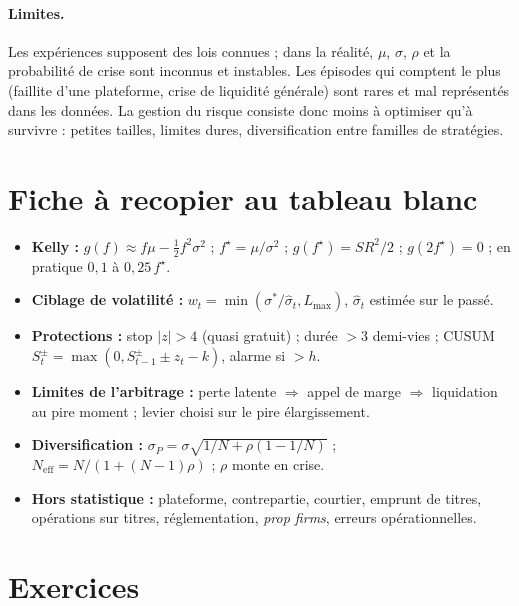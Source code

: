 \paragraph{Limites.} Les expériences supposent des lois connues ; dans la réalité, $\mu$, $\sigma$, $\rho$ et la probabilité de crise sont inconnus et instables. Les épisodes qui comptent le plus (faillite d'une plateforme, crise de liquidité générale) sont rares et mal représentés dans les données. La gestion du risque consiste donc moins à optimiser qu'à survivre : petites tailles, limites dures, diversification entre familles de stratégies.

\section{Fiche à recopier au tableau blanc}

\begin{whiteboard}
\begin{itemize}[leftmargin=1.2em]
\item \textbf{Kelly :} $g(f) \approx f\mu - \tfrac12 f^2\sigma^2$ ; $f^\star = \mu/\sigma^2$ ; $g(f^\star) = SR^2/2$ ; $g(2f^\star) = 0$ ; en pratique $0{,}1$ à $0{,}25\,f^\star$.
\item \textbf{Ciblage de volatilité :} $w_t = \min(\sigma^\ast/\hat\sigma_t, L_{\max})$, $\hat\sigma_t$ estimée sur le passé.
\item \textbf{Protections :} stop $|z|>4$ (quasi gratuit) ; durée $> 3$ demi-vies ; CUSUM $S^\pm_t = \max(0, S^\pm_{t-1} \pm z_t - k)$, alarme si $> h$.
\item \textbf{Limites de l'arbitrage :} perte latente $\Rightarrow$ appel de marge $\Rightarrow$ liquidation au pire moment ; levier choisi sur le pire élargissement.
\item \textbf{Diversification :} $\sigma_P = \sigma\sqrt{1/N + \rho(1-1/N)}$ ; $N_{\text{eff}} = N/(1+(N-1)\rho)$ ; $\rho$ monte en crise.
\item \textbf{Hors statistique :} plateforme, contrepartie, courtier, emprunt de titres, opérations sur titres, réglementation, \emph{prop firms}, erreurs opérationnelles.
\end{itemize}
\end{whiteboard}

\section{Exercices}


